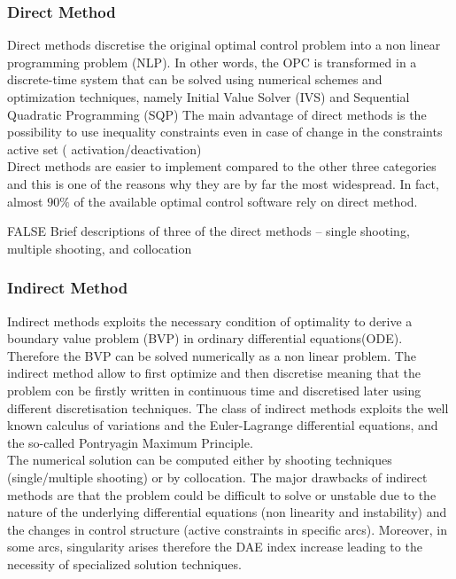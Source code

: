 \subsubsection{Direct Method}

Direct methods discretise the original optimal control problem into a  non linear programming problem (NLP). In other words, the OPC is transformed in a discrete-time system that can be solved using numerical schemes and  optimization techniques, namely Initial Value Solver (IVS) and Sequential Quadratic Programming (SQP) \cite{bertolazzi2005symbolic}
The main advantage of direct methods is the possibility to use inequality constraints even in case of change in the constraints active set ( activation/deactivation)\cite{biral2016notes}\\
Direct methods are easier to implement compared to the other three categories and this is one of the reasons why they are by far the most widespread. In fact, almost $90\%$ of the available optimal control software rely on direct method. \cite{rao2009survey,rodrigues2014optimal}

\if FALSE
Brief descriptions
of three of the direct methods – single shooting, multiple shooting, and collocation
\fi

% 



\subsubsection{Indirect Method}

Indirect methods exploits the necessary condition of optimality to derive a boundary value problem (BVP) in ordinary differential equations(ODE). Therefore the BVP can be solved numerically as a non linear problem. The indirect method allow to first optimize and then discretise meaning that the problem con be firstly written in continuous time and discretised later using different discretisation techniques.
The class of indirect methods exploits the well known calculus of variations
and the Euler-Lagrange differential equations, and the so-called Pontryagin
Maximum Principle.\cite{bertolazzi2006symbolic} \\
The numerical solution can be computed either by shooting techniques (single/multiple shooting) or by collocation.
The major drawbacks of indirect methods are that the problem could be difficult to solve or unstable due to the nature of the underlying differential equations (non linearity and instability) and the changes in control structure (active constraints in specific arcs). Moreover, in some arcs, singularity arises therefore the DAE index increase leading to the necessity of specialized solution techniques. \cite{biral2016notes}


